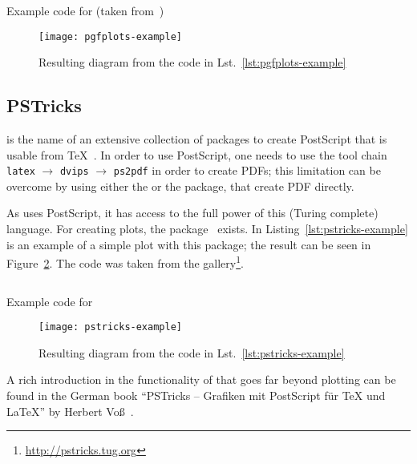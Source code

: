 \begin{listing}[H]
  \inputminted{latex}{../examples/pgfplots-example.tex}
  \caption{Example code for  (taken
    from~\cite{Feuersaenger2016})}
  \label{lst:pgfplots-example}
\end{listing}
\begin{figure}[!t]
  \centering
  \texttt{[image: pgfplots-example]}
  \caption{Resulting diagram from the code in Lst.~\ref{lst:pgfplots-example}}
  \label{fig:pgfplots-example}
\end{figure}

\subsection{PSTricks}

 is the name of an extensive collection of packages to create
PostScript that is usable from \TeX~\cite{Zandt2007}.  In order to use
PostScript, one needs to use the tool chain \texttt{latex} $\rightarrow$
\texttt{dvips} $\rightarrow$ \texttt{ps2pdf} in order to create PDFs; this
limitation can be overcome by using either the  or the
 package, that create PDF directly.

As  uses PostScript, it has access to the full power of this
(Turing complete) language.  For creating plots, the 
package~\cite{Voss2016a} exists.  In Listing~\ref{lst:pstricks-example} is an
example of a simple plot with this package; the result can be seen in
Figure~\ref{fig:pstricks-example}.  The code was taken from the
 gallery\footnote{\href{http://pstricks.tug.org}%
{http://pstricks.tug.org}}.

\begin{listing}[H]
  \inputminted{latex}{../examples/pstricks-example.tex}
  \caption{Example code for }
  \label{lst:pstricks-example}
\end{listing}
\begin{figure}[!t]
  \centering
  \texttt{[image: pstricks-example]}
  \caption{Resulting diagram from the code in Lst.~\ref{lst:pstricks-example}}
  \label{fig:pstricks-example}
\end{figure}

A rich introduction in the functionality of  that goes far
beyond plotting can be found in the German book \enquote{PSTricks -- Grafiken
mit PostScript für \TeX{} und \LaTeX{}} by Herbert Voß~\cite{Voss2016}.

